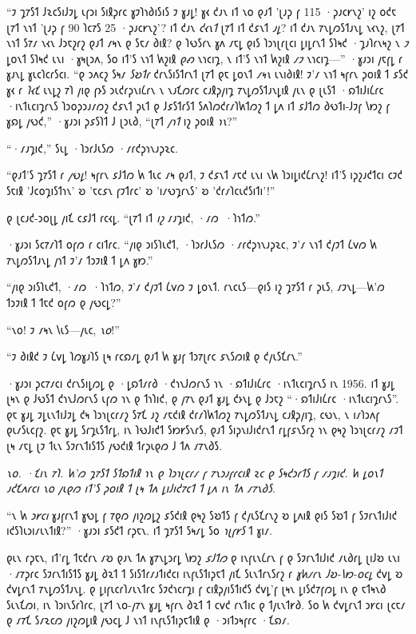 “𐑲 𐑡𐑳𐑕𐑑 𐑓𐑷𐑤𐑕𐑦𐑓𐑲𐑛 𐑧𐑝𐑮𐑦 𐑕𐑦𐑙𐑜𐑩𐑤 𐑣𐑲𐑐𐑪𐑔𐑦𐑕𐑦𐑕 𐑲 𐑣𐑨𐑛! 𐑣𐑬 𐑒𐑨𐑯 𐑦𐑑 𐑯𐑴 𐑞𐑨𐑑 '𐑚𐑨𐑜 𐑝 115 ·𐑜𐑨𐑤𐑾𐑯𐑟' 𐑦𐑟 𐑴𐑒𐑱 𐑚𐑳𐑑 𐑯𐑪𐑑 '𐑚𐑨𐑜 𐑝 90 𐑐𐑤𐑳𐑕 25 ·𐑜𐑨𐑤𐑾𐑯𐑟'? 𐑦𐑑 𐑒𐑨𐑯 \emph{𐑒𐑬𐑯𐑑} 𐑚𐑳𐑑 𐑦𐑑 𐑒𐑭𐑯𐑑 \emph{𐑨𐑛}? 𐑦𐑑 𐑒𐑨𐑯 𐑳𐑯𐑛𐑼𐑕𐑑𐑨𐑯𐑛 𐑯𐑬𐑯𐑟, 𐑚𐑳𐑑 𐑯𐑪𐑑 𐑕𐑳𐑥 𐑯𐑬𐑯 𐑓𐑮𐑱𐑟𐑩𐑟 𐑞𐑨𐑑 𐑥𐑰𐑯 𐑞 𐑕𐑱𐑥 𐑔𐑦𐑙? 𐑞 𐑐𐑻𐑕𐑩𐑯 𐑣𐑵 𐑥𐑱𐑛 𐑞𐑦𐑕 𐑐𐑮𐑪𐑚𐑩𐑚𐑤𐑦 𐑛𐑦𐑛𐑩𐑯𐑑 𐑕𐑐𐑰𐑒 ·𐑡𐑨𐑐𐑩𐑯𐑰𐑟 𐑯 \emph{𐑲} 𐑛𐑴𐑯𐑑 𐑕𐑐𐑰𐑒 𐑧𐑯𐑦 ·𐑣𐑰𐑚𐑮𐑵, 𐑕𐑴 𐑦𐑑'𐑕 𐑯𐑪𐑑 𐑿𐑟𐑦𐑙 \emph{𐑞𐑺} 𐑯𐑪𐑤𐑦𐑡, 𐑯 𐑦𐑑'𐑕 𐑯𐑪𐑑 𐑿𐑟𐑦𐑙 \emph{𐑥𐑲} 𐑯𐑪𐑤𐑦𐑡—” ·𐑣𐑨𐑮𐑦 𐑢𐑱𐑝𐑛 𐑩 𐑣𐑨𐑯𐑛 𐑣𐑧𐑤𐑐𐑤𐑩𐑕𐑤𐑦. “𐑞 𐑮𐑵𐑤𐑟 𐑕𐑰𐑥 \emph{𐑕𐑹𐑑𐑩} 𐑒𐑩𐑯𐑕𐑦𐑕𐑑𐑩𐑯𐑑 𐑚𐑳𐑑 𐑞𐑱 𐑛𐑴𐑯𐑑 \emph{𐑥𐑰𐑯} 𐑧𐑯𐑦𐑔𐑦𐑙! 𐑲'𐑥 𐑯𐑪𐑑 𐑰𐑝𐑩𐑯 𐑜𐑴𐑦𐑙 𐑑 𐑭𐑕𐑒 𐑣𐑬 𐑩 \emph{𐑐𐑬𐑗} 𐑧𐑯𐑛𐑟 𐑳𐑐 𐑢𐑦𐑞 𐑝𐑶𐑕 𐑮𐑧𐑒𐑩𐑜𐑯𐑦𐑖𐑩𐑯 𐑯 𐑯𐑨𐑗𐑼𐑩𐑤 𐑤𐑨𐑙𐑜𐑢𐑦𐑡 𐑳𐑯𐑛𐑼𐑕𐑑𐑨𐑯𐑛𐑦𐑙 𐑢𐑧𐑯 𐑞 𐑚𐑧𐑕𐑑 ·𐑸𐑑𐑦𐑓𐑦𐑖𐑩𐑤 ·𐑦𐑯𐑑𐑧𐑤𐑦𐑡𐑩𐑯𐑕 𐑐𐑮𐑴𐑜𐑮𐑨𐑥𐑼𐑟 𐑒𐑭𐑯𐑑 𐑜𐑧𐑑 𐑞 𐑓𐑭𐑕𐑑𐑩𐑕𐑑 𐑕𐑵𐑐𐑼𐑒𐑩𐑥𐑐𐑿𐑑𐑼𐑟 𐑑 𐑛𐑵 𐑦𐑑 𐑭𐑓𐑑𐑼 𐑔𐑻𐑑𐑦-𐑓𐑲𐑝 𐑘𐑽𐑟 𐑝 𐑣𐑸𐑛 𐑢𐑻𐑒,” ·𐑣𐑨𐑮𐑦 𐑜𐑭𐑕𐑐𐑑 𐑓 𐑚𐑮𐑧𐑔, “𐑚𐑳𐑑 \emph{𐑢𐑪𐑑} 𐑦𐑟 𐑜𐑴𐑦𐑙 \emph{𐑪𐑯}?”

“·𐑥𐑨𐑡𐑦𐑒,” 𐑕𐑧𐑛 ·𐑐𐑮𐑩𐑓𐑧𐑕𐑼 ·𐑥𐑩𐑒𐑜𐑪𐑯𐑨𐑜𐑷𐑤.

“𐑞𐑨𐑑'𐑕 𐑡𐑳𐑕𐑑 𐑩 \emph{𐑢𐑻𐑛}! 𐑰𐑝𐑩𐑯 𐑭𐑓𐑑𐑼 𐑿 𐑑𐑧𐑤 𐑥𐑰 𐑞𐑨𐑑, 𐑲 𐑒𐑭𐑯𐑑 𐑥𐑱𐑒 𐑧𐑯𐑦 𐑯𐑿 𐑐𐑮𐑦𐑛𐑦𐑒𐑖𐑩𐑯𐑟! 𐑦𐑑'𐑕 𐑦𐑜𐑟𐑨𐑒𐑑𐑤𐑦 𐑤𐑲𐑒 𐑕𐑱𐑦𐑙 '𐑓𐑤𐑴𐑡𐑦𐑕𐑑𐑪𐑯' 𐑹 '𐑱𐑤𐑭𐑯 𐑝𐑲𐑑𐑩𐑤' 𐑹 '𐑦𐑥𐑻𐑡𐑩𐑯𐑕' 𐑹 '𐑒𐑩𐑥𐑐𐑤𐑧𐑒𐑕𐑦𐑑𐑦'!”

𐑞 𐑚𐑤𐑨𐑒-𐑮𐑴𐑚𐑛 𐑢𐑦𐑗 𐑤𐑭𐑓𐑑 𐑩𐑤𐑬𐑛. “𐑚𐑳𐑑 𐑦𐑑 \emph{𐑦𐑟} 𐑥𐑨𐑡𐑦𐑒, ·𐑥𐑼~·𐑐𐑪𐑑𐑼.”

·𐑣𐑨𐑮𐑦 𐑕𐑤𐑳𐑥𐑐𐑑 𐑴𐑝𐑼 𐑩 𐑤𐑦𐑑𐑩𐑤. “𐑢𐑦𐑞 𐑮𐑦𐑕𐑐𐑧𐑒𐑑, ·𐑐𐑮𐑩𐑓𐑧𐑕𐑼 ·𐑥𐑩𐑒𐑜𐑪𐑯𐑨𐑜𐑷𐑤, 𐑲'𐑥 𐑯𐑪𐑑 𐑒𐑢𐑲𐑑 𐑖𐑫𐑼 𐑿 𐑳𐑯𐑛𐑼𐑕𐑑𐑨𐑯𐑛 𐑢𐑪𐑑 𐑲'𐑥 𐑑𐑮𐑲𐑦𐑙 𐑑 𐑛𐑵 𐑣𐑽.”

“𐑢𐑦𐑞 𐑮𐑦𐑕𐑐𐑧𐑒𐑑, ·𐑥𐑼~·𐑐𐑪𐑑𐑼, 𐑲'𐑥 𐑒𐑢𐑲𐑑 𐑖𐑫𐑼 𐑲 𐑛𐑴𐑯𐑑. 𐑩𐑯𐑤𐑧𐑕—𐑞𐑦𐑕 𐑦𐑟 𐑡𐑳𐑕𐑑 𐑩 𐑜𐑧𐑕, 𐑥𐑲𐑯𐑛—𐑿'𐑼 𐑑𐑮𐑲𐑦𐑙 𐑑 𐑑𐑱𐑒 𐑴𐑝𐑼 𐑞 𐑢𐑻𐑤𐑛?”

“𐑯𐑴! 𐑲 𐑥𐑰𐑯 𐑘𐑧𐑕—𐑢𐑧𐑤, \emph{𐑯𐑴}!”

“𐑲 𐑔𐑦𐑙𐑒 𐑲 𐑖𐑫𐑛 𐑐𐑼𐑣𐑨𐑐𐑕 𐑚𐑰 𐑩𐑤𐑸𐑥𐑛 𐑞𐑨𐑑 𐑿 𐑣𐑨𐑝 𐑑𐑮𐑳𐑚𐑩𐑤 𐑭𐑯𐑕𐑼𐑦𐑙 𐑞 𐑒𐑢𐑧𐑕𐑗𐑩𐑯.”

·𐑣𐑨𐑮𐑦 𐑜𐑤𐑳𐑥𐑤𐑦 𐑒𐑩𐑯𐑕𐑦𐑛𐑼𐑛 𐑞 ·𐑛𐑸𐑑𐑥𐑩𐑔 ·𐑒𐑪𐑯𐑓𐑼𐑩𐑯𐑕 𐑪𐑯 ·𐑸𐑑𐑦𐑓𐑦𐑖𐑩𐑤 ·𐑦𐑯𐑑𐑧𐑤𐑦𐑡𐑩𐑯𐑕 𐑦𐑯 1956. 𐑦𐑑 𐑣𐑨𐑛 𐑚𐑰𐑯 𐑞 𐑓𐑻𐑕𐑑 𐑒𐑪𐑯𐑓𐑼𐑩𐑯𐑕 𐑧𐑝𐑼 𐑪𐑯 𐑞 𐑑𐑪𐑐𐑦𐑒, 𐑞 𐑢𐑳𐑯 𐑞𐑨𐑑 𐑣𐑨𐑛 𐑒𐑶𐑯𐑛 𐑞 𐑓𐑮𐑱𐑟 “·𐑸𐑑𐑦𐑓𐑦𐑖𐑩𐑤 ·𐑦𐑯𐑑𐑧𐑤𐑦𐑡𐑩𐑯𐑕”. 𐑞𐑱 𐑣𐑨𐑛 𐑲𐑛𐑧𐑯𐑑𐑦𐑓𐑲𐑛 𐑒𐑰 𐑐𐑮𐑪𐑚𐑤𐑩𐑥𐑟 𐑕𐑳𐑗 𐑨𐑟 𐑥𐑱𐑒𐑦𐑙 𐑒𐑩𐑥𐑐𐑿𐑑𐑼𐑟 𐑳𐑯𐑛𐑼𐑕𐑑𐑨𐑯𐑛 𐑤𐑨𐑙𐑜𐑢𐑦𐑡, 𐑤𐑻𐑯, 𐑯 𐑦𐑥𐑐𐑮𐑵𐑝 𐑞𐑧𐑥𐑕𐑧𐑤𐑝𐑟. 𐑞𐑱 𐑣𐑨𐑛 𐑕𐑩𐑡𐑧𐑕𐑑𐑩𐑛, 𐑦𐑯 𐑐𐑻𐑓𐑦𐑒𐑑 𐑕𐑽𐑾𐑕𐑯𐑩𐑕, 𐑞𐑨𐑑 𐑕𐑦𐑜𐑯𐑦𐑓𐑦𐑒𐑩𐑯𐑑 𐑩𐑛𐑝𐑭𐑯𐑕𐑩𐑟 𐑪𐑯 𐑞𐑰𐑟 𐑐𐑮𐑪𐑚𐑤𐑩𐑥𐑟 𐑥𐑲𐑑 𐑚𐑰 𐑥𐑱𐑛 𐑚𐑲 𐑑𐑧𐑯 𐑕𐑲𐑩𐑯𐑑𐑦𐑕𐑑𐑕 𐑢𐑻𐑒𐑦𐑙 𐑑𐑩𐑜𐑧𐑞𐑼 𐑓 𐑑𐑵 𐑥𐑳𐑯𐑔𐑕.

\emph{𐑯𐑴. ·𐑗𐑦𐑯 𐑳𐑐. 𐑿'𐑼 𐑡𐑳𐑕𐑑 \emph{𐑕𐑑𐑸𐑑𐑦𐑙} 𐑪𐑯 𐑞 𐑐𐑮𐑪𐑚𐑤𐑩𐑥 𐑝 𐑳𐑯𐑮𐑨𐑝𐑩𐑤𐑦𐑙 𐑷𐑤 𐑞 𐑕𐑰𐑒𐑮𐑩𐑑𐑕 𐑝 𐑥𐑨𐑡𐑦𐑒. 𐑿 𐑛𐑴𐑯𐑑 𐑨𐑒𐑗𐑵𐑩𐑤𐑦 \emph{𐑯𐑴} 𐑢𐑧𐑞𐑼 𐑦𐑑'𐑕 𐑜𐑴𐑦𐑙 𐑑 𐑚𐑰 𐑑𐑵 𐑛𐑦𐑓𐑦𐑒𐑳𐑤𐑑 𐑑 𐑛𐑵 𐑦𐑯 𐑑𐑵 𐑥𐑳𐑯𐑔𐑕.}

“𐑯 𐑿 \emph{𐑮𐑾𐑤𐑦} 𐑣𐑨𐑝𐑩𐑯𐑑 𐑣𐑻𐑛 𐑝 𐑳𐑞𐑼 𐑢𐑦𐑟𐑼𐑛𐑟 𐑭𐑕𐑒𐑦𐑙 𐑞𐑰𐑟 𐑕𐑹𐑑𐑕 𐑝 𐑒𐑢𐑧𐑕𐑗𐑩𐑯𐑟 𐑹 𐑛𐑵𐑦𐑙 𐑞𐑦𐑕 𐑕𐑹𐑑 𐑝 𐑕𐑲𐑩𐑯𐑑𐑦𐑓𐑦𐑒 𐑦𐑒𐑕𐑐𐑧𐑮𐑦𐑥𐑧𐑯𐑑𐑦𐑙?” ·𐑣𐑨𐑮𐑦 𐑭𐑕𐑒𐑑 𐑩𐑜𐑱𐑯. 𐑦𐑑 𐑡𐑳𐑕𐑑 𐑕𐑰𐑥𐑛 𐑕𐑴 \emph{𐑪𐑚𐑝𐑾𐑕} 𐑑 𐑣𐑦𐑥.

𐑞𐑧𐑯 𐑩𐑜𐑱𐑯, 𐑦𐑑'𐑩𐑛 𐑑𐑱𐑒𐑩𐑯 𐑥𐑹 𐑞𐑨𐑯 𐑑𐑵 𐑣𐑳𐑯𐑛𐑮𐑩𐑛 𐑘𐑽𐑟 \emph{𐑭𐑓𐑑𐑼} 𐑞 𐑦𐑯𐑝𐑧𐑯𐑖𐑩𐑯 𐑝 𐑞 𐑕𐑲𐑩𐑯𐑑𐑦𐑓𐑦𐑒 𐑥𐑧𐑔𐑩𐑛 𐑚𐑦𐑓𐑹 𐑧𐑯𐑦 ·𐑥𐑳𐑜𐑩𐑤 𐑕𐑲𐑩𐑯𐑑𐑦𐑕𐑑𐑕 𐑣𐑨𐑛 𐑔𐑷𐑑 𐑑 𐑕𐑦𐑕𐑑𐑩𐑥𐑨𐑑𐑦𐑒𐑤𐑦 𐑦𐑯𐑝𐑧𐑕𐑑𐑦𐑜𐑱𐑑 𐑢𐑦𐑗 𐑕𐑧𐑯𐑑𐑩𐑯𐑕𐑩𐑟 𐑩 \emph{𐑣𐑿𐑥𐑩𐑯 𐑓𐑹-𐑘𐑽-𐑴𐑤𐑛} 𐑒𐑫𐑛 𐑹 𐑒𐑫𐑛𐑩𐑯𐑑 𐑳𐑯𐑛𐑼𐑕𐑑𐑨𐑯𐑛. 𐑞 𐑛𐑦𐑝𐑧𐑤𐑩𐑐𐑥𐑧𐑯𐑑𐑩𐑤 𐑕𐑲𐑒𐑪𐑤𐑩𐑡𐑦 𐑝 𐑤𐑦𐑙𐑜𐑢𐑦𐑕𐑑𐑦𐑒𐑕 𐑒𐑫𐑛'𐑝 𐑚𐑰𐑯 𐑛𐑦𐑕𐑒𐑳𐑝𐑼𐑛 𐑦𐑯 𐑞 𐑱𐑑𐑰𐑯𐑔 𐑕𐑧𐑯𐑗𐑼𐑦, 𐑦𐑯 𐑐𐑮𐑦𐑯𐑕𐑩𐑐𐑩𐑤, 𐑚𐑳𐑑 𐑯𐑴-𐑢𐑳𐑯 𐑣𐑨𐑛 𐑰𐑝𐑩𐑯 𐑔𐑷𐑑 𐑑 𐑤𐑫𐑒 𐑩𐑯𐑑𐑦𐑤 𐑞 𐑑𐑢𐑧𐑯𐑑𐑾𐑔. 𐑕𐑴 𐑿 𐑒𐑫𐑛𐑩𐑯𐑑 𐑮𐑾𐑤𐑦 𐑚𐑤𐑱𐑥 𐑞 𐑥𐑳𐑗 𐑕𐑥𐑷𐑤𐑼 𐑢𐑦𐑟𐑼𐑛𐑦𐑙 𐑢𐑻𐑤𐑛 𐑓 𐑯𐑪𐑑 𐑦𐑯𐑝𐑧𐑕𐑑𐑦𐑜𐑱𐑑𐑦𐑙 𐑞 ·𐑮𐑦𐑑𐑮𐑰𐑝𐑩𐑤 ·𐑗𐑸𐑥.

